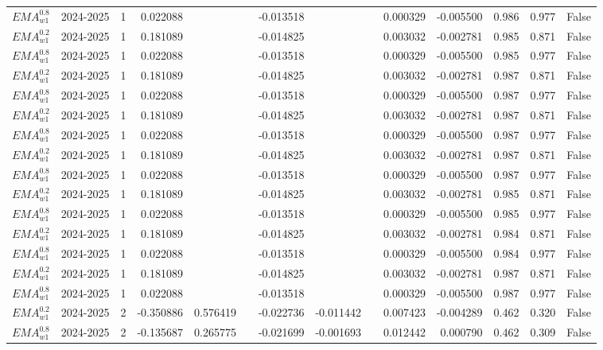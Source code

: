 \begin{tabular}{@{}llrrrrrrrrrlll@{}}
$EMA^{0.8}_{w1}$ & 2024-2025 & 1 & 0.022088 &  &  & -0.013518 &  &  & 0.000329 & -0.005500 & 0.986 & 0.977 & False \\
$EMA^{0.2}_{w1}$ & 2024-2025 & 1 & 0.181089 &  &  & -0.014825 &  &  & 0.003032 & -0.002781 & 0.985 & 0.871 & False \\
$EMA^{0.8}_{w1}$ & 2024-2025 & 1 & 0.022088 &  &  & -0.013518 &  &  & 0.000329 & -0.005500 & 0.985 & 0.977 & False \\
$EMA^{0.2}_{w1}$ & 2024-2025 & 1 & 0.181089 &  &  & -0.014825 &  &  & 0.003032 & -0.002781 & 0.987 & 0.871 & False \\
$EMA^{0.8}_{w1}$ & 2024-2025 & 1 & 0.022088 &  &  & -0.013518 &  &  & 0.000329 & -0.005500 & 0.987 & 0.977 & False \\
$EMA^{0.2}_{w1}$ & 2024-2025 & 1 & 0.181089 &  &  & -0.014825 &  &  & 0.003032 & -0.002781 & 0.987 & 0.871 & False \\
$EMA^{0.8}_{w1}$ & 2024-2025 & 1 & 0.022088 &  &  & -0.013518 &  &  & 0.000329 & -0.005500 & 0.987 & 0.977 & False \\
$EMA^{0.2}_{w1}$ & 2024-2025 & 1 & 0.181089 &  &  & -0.014825 &  &  & 0.003032 & -0.002781 & 0.987 & 0.871 & False \\
$EMA^{0.8}_{w1}$ & 2024-2025 & 1 & 0.022088 &  &  & -0.013518 &  &  & 0.000329 & -0.005500 & 0.987 & 0.977 & False \\
$EMA^{0.2}_{w1}$ & 2024-2025 & 1 & 0.181089 &  &  & -0.014825 &  &  & 0.003032 & -0.002781 & 0.985 & 0.871 & False \\
$EMA^{0.8}_{w1}$ & 2024-2025 & 1 & 0.022088 &  &  & -0.013518 &  &  & 0.000329 & -0.005500 & 0.985 & 0.977 & False \\
$EMA^{0.2}_{w1}$ & 2024-2025 & 1 & 0.181089 &  &  & -0.014825 &  &  & 0.003032 & -0.002781 & 0.984 & 0.871 & False \\
$EMA^{0.8}_{w1}$ & 2024-2025 & 1 & 0.022088 &  &  & -0.013518 &  &  & 0.000329 & -0.005500 & 0.984 & 0.977 & False \\
$EMA^{0.2}_{w1}$ & 2024-2025 & 1 & 0.181089 &  &  & -0.014825 &  &  & 0.003032 & -0.002781 & 0.987 & 0.871 & False \\
$EMA^{0.8}_{w1}$ & 2024-2025 & 1 & 0.022088 &  &  & -0.013518 &  &  & 0.000329 & -0.005500 & 0.987 & 0.977 & False \\
$EMA^{0.2}_{w1}$ & 2024-2025 & 2 & -0.350886 & 0.576419 &  & -0.022736 & -0.011442 &  & 0.007423 & -0.004289 & 0.462 & 0.320 & False \\
$EMA^{0.8}_{w1}$ & 2024-2025 & 2 & -0.135687 & 0.265775 &  & -0.021699 & -0.001693 &  & 0.012442 & 0.000790 & 0.462 & 0.309 & False \\

\end{tabular}
